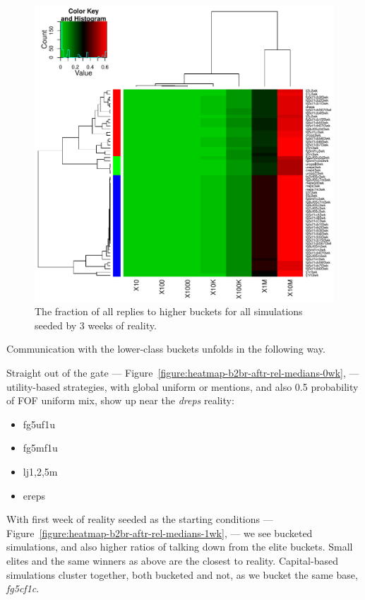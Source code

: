 \documentclass[10pt,oneside]{memoir}
\begin{document}
\begin{Spacing}{2}
\begin{figure}
\begin{center}
    \includegraphics{figures/crop/heatmap-b2br-befr-rel-medians-3wk}
    \caption{The fraction of all replies to higher buckets for all simulations seeded by 3 weeks of reality.}
    \label{figure:heatmap-b2br-befr-rel-medians-3wk}
\end{center}
\end{figure}
Communication with the lower-class buckets unfolds in the following way.


Straight out of the gate --- Figure~\ref{figure:heatmap-b2br-aftr-rel-medians-0wk}, --- utility-based strategies, with global uniform or mentions, and also 0.5 probability of FOF uniform mix, show up near the {\itshape dreps} reality:


\begin{itemize}


\item fg5uf1u

\item fg5mf1u

\item lj{1,2,5}m

\item ereps
\end{itemize}

With first week of reality seeded as the starting conditions --- Figure~\ref{figure:heatmap-b2br-aftr-rel-medians-1wk}, --- we see bucketed simulations, and also higher ratios of talking down from the elite buckets.  Small elites and the same winners as above are the closest to reality.   Capital-based simulations cluster together, both bucketed and not, as we bucket the same base, {\itshape fg5cf1c}.



\end{Spacing}
\end{document}
